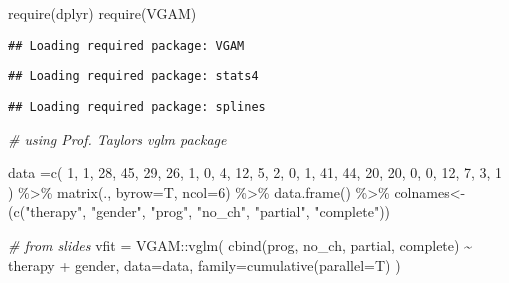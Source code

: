 \documentclass[
]{article}
\newenvironment{Shaded}{\begin{snugshade}}{\end{snugshade}}
\newcommand{\AttributeTok}[1]{\textcolor[rgb]{0.77,0.63,0.00}{#1}}
\newcommand{\CommentTok}[1]{\textcolor[rgb]{0.56,0.35,0.01}{\textit{#1}}}
\newcommand{\DecValTok}[1]{\textcolor[rgb]{0.00,0.00,0.81}{#1}}
\newcommand{\FunctionTok}[1]{\textcolor[rgb]{0.00,0.00,0.00}{#1}}
\newcommand{\NormalTok}[1]{#1}
\newcommand{\OtherTok}[1]{\textcolor[rgb]{0.56,0.35,0.01}{#1}}
\newcommand{\SpecialCharTok}[1]{\textcolor[rgb]{0.00,0.00,0.00}{#1}}
\newcommand{\StringTok}[1]{\textcolor[rgb]{0.31,0.60,0.02}{#1}}
\begin{document}
\begin{Shaded}
\begin{Highlighting}[]
\FunctionTok{require}\NormalTok{(dplyr)}
\FunctionTok{require}\NormalTok{(VGAM)}
\end{Highlighting}
\end{Shaded}

\begin{verbatim}
## Loading required package: VGAM
\end{verbatim}

\begin{verbatim}
## Loading required package: stats4
\end{verbatim}

\begin{verbatim}
## Loading required package: splines
\end{verbatim}

\begin{Shaded}
\begin{Highlighting}[]
\CommentTok{\#\textquotesingle{} using Prof. Taylors vglm package}

\NormalTok{data }\OtherTok{=}\FunctionTok{c}\NormalTok{(}
  \DecValTok{1}\NormalTok{, }\DecValTok{1}\NormalTok{, }\DecValTok{28}\NormalTok{, }\DecValTok{45}\NormalTok{, }\DecValTok{29}\NormalTok{, }\DecValTok{26}\NormalTok{,}
  \DecValTok{1}\NormalTok{, }\DecValTok{0}\NormalTok{, }\DecValTok{4}\NormalTok{, }\DecValTok{12}\NormalTok{, }\DecValTok{5}\NormalTok{, }\DecValTok{2}\NormalTok{,}
  \DecValTok{0}\NormalTok{, }\DecValTok{1}\NormalTok{, }\DecValTok{41}\NormalTok{, }\DecValTok{44}\NormalTok{, }\DecValTok{20}\NormalTok{, }\DecValTok{20}\NormalTok{,}
  \DecValTok{0}\NormalTok{, }\DecValTok{0}\NormalTok{, }\DecValTok{12}\NormalTok{, }\DecValTok{7}\NormalTok{, }\DecValTok{3}\NormalTok{, }\DecValTok{1}
\NormalTok{) }\SpecialCharTok{\%\textgreater{}\%}
  \FunctionTok{matrix}\NormalTok{(., }\AttributeTok{byrow=}\NormalTok{T, }\AttributeTok{ncol=}\DecValTok{6}\NormalTok{) }\SpecialCharTok{\%\textgreater{}\%}
  \FunctionTok{data.frame}\NormalTok{() }\SpecialCharTok{\%\textgreater{}\%}
  \StringTok{\textasciigrave{}}\AttributeTok{colnames\textless{}{-}}\StringTok{\textasciigrave{}}\NormalTok{(}\FunctionTok{c}\NormalTok{(}\StringTok{"therapy"}\NormalTok{, }\StringTok{"gender"}\NormalTok{, }\StringTok{"prog"}\NormalTok{, }\StringTok{"no\_ch"}\NormalTok{, }\StringTok{"partial"}\NormalTok{, }\StringTok{"complete"}\NormalTok{))}

\CommentTok{\# from slides}
\NormalTok{vfit }\OtherTok{=}\NormalTok{ VGAM}\SpecialCharTok{::}\FunctionTok{vglm}\NormalTok{(}
  \FunctionTok{cbind}\NormalTok{(prog, no\_ch, partial, complete) }\SpecialCharTok{\textasciitilde{}}\NormalTok{ therapy }\SpecialCharTok{+}\NormalTok{ gender,}
  \AttributeTok{data=}\NormalTok{data,}
  \AttributeTok{family=}\FunctionTok{cumulative}\NormalTok{(}\AttributeTok{parallel=}\NormalTok{T)}
\NormalTok{)}
\end{Highlighting}
\end{Shaded}
\end{document}
